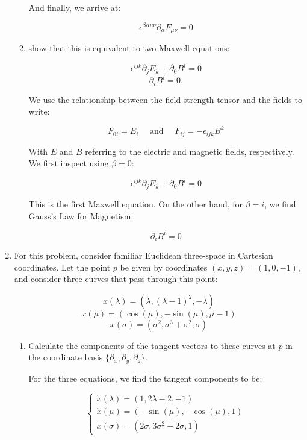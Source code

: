 \begin{enumerate}
\begin{enumerate}
      And finally, we arrive at:

      $$\boxed{\epsilon^{\beta\alpha\mu\nu}\partial_{\alpha}F_{\mu\nu}=0}$$ 

      \item show that this is equivalent to two Maxwell equations: 

        $$\epsilon^{ijk}\partial_jE_k + \partial_0B^i = 0$$
        $$\partial_iB^i = 0.$$

        We use the relationship between the field-strength tensor and the fields to write:

        $$F_{0i}=E_i\quad\text{ and }\quad F_{ij}=-\epsilon_{ijk}B^k$$

        With $E$ and $B$ referring to the electric and magnetic fields, respectively. We first inspect using $\beta=0$:

        $$\boxed{\epsilon^{ijk}\partial_jE_k+\partial_0B^i=0}$$

        This is the first Maxwell equation. On the other hand, for $\beta=i$, we find Gauss's Law for Magnetism:

        $$\boxed{\partial_iB^i=0}$$

    \end{enumerate}

  \item For this problem, consider familiar Euclidean three-space in Cartesian coordinates. Let the point $p$ be given by coordinates $(x, y, z) = (1, 0, -1)$, and consider three curves that pass through this point:

    $$x(\lambda)=(\lambda, (\lambda-1)^2,-\lambda)$$
    $$x(\mu)=(\cos(\mu),-\sin(\mu),\mu-1)$$
    $$x(\sigma)=(\sigma^2, \sigma^3+\sigma^2,\sigma)$$

    \begin{enumerate}

      \item Calculate the components of the tangent vectors to these curves at $p$ in the coordinate basis $\{\partial_x, \partial_y, \partial_z \}$.

        For the three equations, we find the tangent components to be:

        $$\left\{\begin{array}{l} \dot{x}(\lambda)=(1,2\lambda-2,-1)\\\dot{x}(\mu)=(-\sin(\mu),-\cos(\mu),1)\\\dot{x}(\sigma)=(2\sigma,3\sigma^2+2\sigma,1)\end{array}$$


\end{enumerate}
\end{enumerate}

